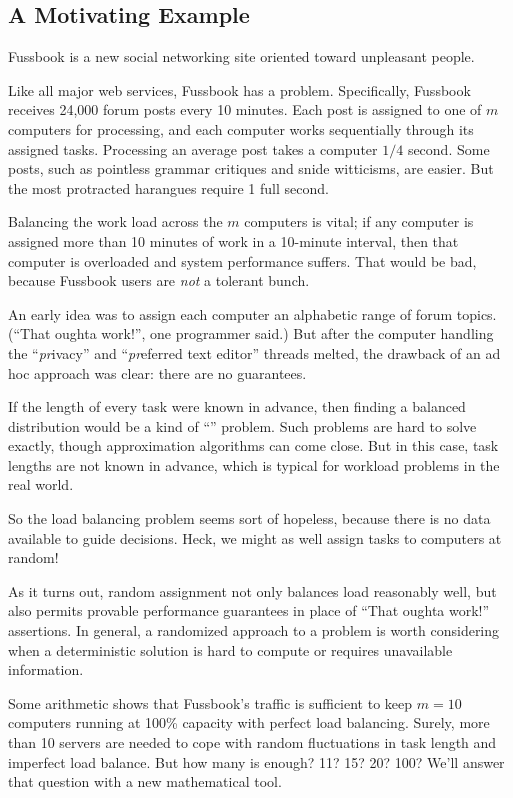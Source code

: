 \subsection{A Motivating Example}

Fussbook is a new social networking site oriented toward unpleasant
people.

Like all major web services, Fussbook has a  problem.
Specifically, Fussbook receives 24,000 forum posts every 10 minutes.
Each post is assigned to one of $m$ computers for processing, and each
computer works sequentially through its assigned tasks.  Processing an
average post takes a computer $1/4$ second.  Some posts, such as
pointless grammar critiques and snide witticisms, are easier.  But the
most protracted harangues require 1 full second.

Balancing the work load across the $m$ computers is vital; if any
computer is assigned more than 10 minutes of work in a 10-minute
interval, then that computer is overloaded and system performance
suffers.  That would be bad, because Fussbook users are \emph{not} a
tolerant bunch.

An early idea was to assign each computer an alphabetic range of forum
topics.  (``That oughta work!'', one programmer said.)  But after the
computer handling the ``\emph{pr}ivacy'' and ``\emph{pr}eferred text
editor'' threads melted, the drawback of an ad hoc approach was clear:
there are no guarantees.

If the length of every task were known in advance, then finding a
balanced distribution would be a kind of ``''
problem.  Such problems are hard to solve exactly, though
approximation algorithms can come close.  But in this case, task
lengths are not known in advance, which is typical for workload
problems in the real world.

So the load balancing problem seems sort of hopeless, because there is
no data available to guide decisions.  Heck, we might as well assign
tasks to computers at random!

As it turns out, random assignment not only balances load reasonably
well, but also permits provable performance guarantees in place of
``That oughta work!''  assertions.  In general, a randomized approach
to a problem is worth considering when a deterministic solution is
hard to compute or requires unavailable information.

Some arithmetic shows that Fussbook's traffic is sufficient to keep $m
= 10$ computers running at 100\% capacity with perfect load balancing.
Surely, more than 10 servers are needed to cope with random
fluctuations in task length and imperfect load balance.  But how many
is enough?  11?  15?  20?  100? We'll answer that question with a new
mathematical tool.

